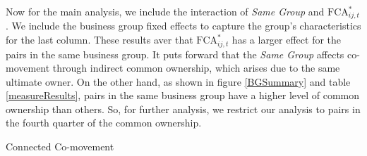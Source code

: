 \documentclass[12pt, a4paper]{article}
\begin{document}
 Now for the main analysis, we include the interaction of \textit{Same Group} and $\text{FCA}^*_{ij,t}$. We include the business group fixed effects to capture the group's characteristics for the last column. These results aver that $\text{FCA}^*_{ij,t}$ has a larger effect for the pairs in the same business group. It puts forward that the \textit{Same Group}  affects co-movement through indirect common ownership, which arises due to the same ultimate owner. On the other hand, as shown in figure \ref{BGSummary} and table \ref{measureResults}, pairs in the same business group have a higher level of common ownership than others. So, for further analysis, we restrict our analysis to pairs in the fourth quarter of the common ownership.
 \begin{landscape}
\begin{table}[htbp]
	\centering
	\caption{Connected Co-movement}
	\label{mresult2}
		
\end{table}
 \end{landscape}
\FloatBarrier
\end{document}
